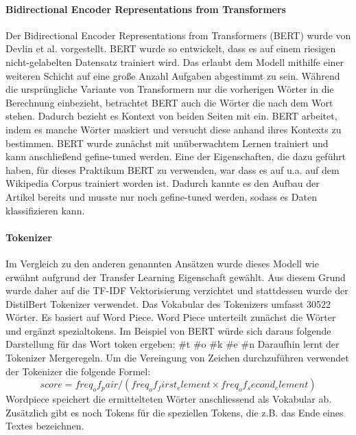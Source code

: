 \paragraph{Bidirectional Encoder Representations from Transformers}
Der Bidirectional Encoder Representations from Transformers (BERT) wurde von Devlin et al.  \cite{BERTReference} vorgestellt. BERT wurde so entwickelt, dass es auf einem riesigen nicht-gelabelten Datensatz trainiert wird. Das erlaubt dem Modell mithilfe einer weiteren Schicht auf eine große Anzahl Aufgaben abgestimmt zu sein. Während die ursprüngliche Variante von Transformern nur die vorherigen Wörter in die Berechnung einbezieht, betrachtet BERT auch die Wörter die nach dem Wort stehen. Dadurch bezieht es Kontext von beiden Seiten mit ein. BERT arbeitet, indem es manche Wörter maskiert und versucht diese anhand ihres Kontexts zu bestimmen. BERT wurde zunächst mit unüberwachtem Lernen trainiert und kann anschließend gefine-tuned werden. Eine der Eigenschaften, die dazu geführt haben, für dieses Praktikum BERT zu verwenden, war dass es auf u.a. auf dem Wikipedia Corpus trainiert worden ist. Dadurch kannte es den Aufbau der Artikel bereits und musste nur noch gefine-tuned werden, sodass es Daten klassifizieren kann.

\paragraph{Tokenizer}
Im Vergleich zu den anderen genannten Ansätzen wurde dieses Modell wie erwähnt aufgrund der Transfer Learning Eigenschaft gewählt. Aus diesem Grund wurde daher auf die TF-IDF Vektorisierung verzichtet und stattdessen wurde der DistilBert Tokenizer verwendet. Das Vokabular des Tokenizers umfasst 30522 Wörter. Es basiert auf Word Piece. Word Piece unterteilt zunächst die Wörter und ergänzt spezialtokens. Im Beispiel von BERT würde sich daraus folgende Darstellung für das Wort token ergeben: #t #o #k #e #n
Daraufhin lernt der Tokenizer Mergeregeln. Um die Vereingung von Zeichen durchzuführen verwendet der Tokenizer die folgende Formel:
$$score = freq_of_pair/(freq_of_first_element \times freq_of_second_element)$$
Wordpiece speichert die ermittelteten Wörter anschliessend als Vokabular ab. Zusätzlich gibt es noch Tokens für die speziellen Tokens, die z.B. das Ende eines Textes bezeichnen.

